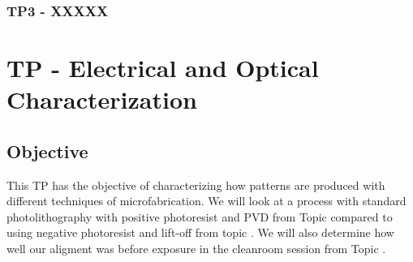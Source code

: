 \documentclass[a4paper, table]{article}
\begin{document}
    \subsubsection{TP3 - XXXXX}
    
    \lipsum[1]
\newpage


















\section{TP - Electrical and Optical Characterization}
\label{sec:TP}


\subsection{Objective}
This TP has the objective of characterizing how patterns are produced with different techniques of microfabrication. We will look at a process with standard photolithography with positive photoresist and PVD from Topic  compared to using negative photoresist and lift-off from topic . We will also determine how well our aligment was before exposure in the cleanroom session from Topic .


\end{document}

